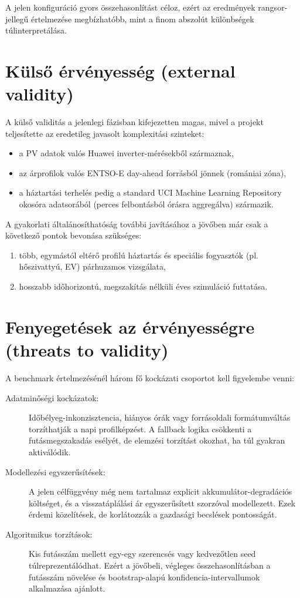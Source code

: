A jelen konfiguráció gyors összehasonlítást céloz, ezért az eredmények rangsor-jellegű értelmezése megbízhatóbb, mint a finom abszolút különbségek túlinterpretálása.

\section{Külső érvényesség (external validity)}
A külső validitás a jelenlegi fázisban kifejezetten magas, mivel a projekt teljesítette az eredetileg javasolt komplexitási szinteket:
\begin{itemize}
  \item a PV adatok valós Huawei inverter-mérésekből származnak,
  \item az árprofilok valós ENTSO-E day-ahead forrásból jönnek (romániai zóna),
  \item a háztartási terhelés pedig a standard UCI Machine Learning Repository okosóra adatsorából (perces felbontásból órásra aggregálva) származik.
\end{itemize}

A gyakorlati általánosíthatóság további javításához a jövőben már csak a következő pontok bevonása szükséges:
\begin{enumerate}
  \item több, egymástól eltérő profilú háztartás és speciális fogyasztók (pl. hőszivattyú, EV) párhuzamos vizsgálata,
  \item hosszabb időhorizontú, megszakítás nélküli éves szimuláció futtatása.
\end{enumerate}

\section{Fenyegetések az érvényességre (threats to validity)}
A benchmark értelmezésénél három fő kockázati csoportot kell figyelembe venni:
\begin{description}
  \item[Adatminőségi kockázatok:] Időbélyeg-inkonzisztencia, hiányos órák vagy forrásoldali formátumváltás torzíthatják a napi profilképzést. A fallback logika csökkenti a futásmegszakadás esélyét, de elemzési torzítást okozhat, ha túl gyakran aktiválódik.
  \item[Modellezési egyszerűsítések:] A jelen célfüggvény még nem tartalmaz explicit akkumulátor-degradációs költséget, és a visszatáplálási ár egyszerűsített szorzóval modellezett. Ezek érdemi közelítések, de korlátozzák a gazdasági becslések pontosságát.
  \item[Algoritmikus torzítások:] Kis futásszám mellett egy-egy szerencsés vagy kedvezőtlen seed túlreprezentálódhat. Ezért a jövőbeli, végleges összehasonlításban a futásszám növelése és bootstrap-alapú konfidencia-intervallumok alkalmazása ajánlott.
\end{description}

